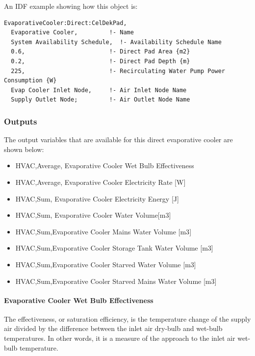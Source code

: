 An IDF example showing how this object is:

\begin{lstlisting}
EvaporativeCooler:Direct:CelDekPad,
  Evaporative Cooler,         !- Name
  System Availability Schedule,  !- Availability Schedule Name
  0.6,                        !- Direct Pad Area {m2}
  0.2,                        !- Direct Pad Depth {m}
  225,                        !- Recirculating Water Pump Power Consumption {W}
  Evap Cooler Inlet Node,     !- Air Inlet Node Name
  Supply Outlet Node;         !- Air Outlet Node Name
\end{lstlisting}

\subsubsection{Outputs}

The output variables that are available for this direct evaporative cooler are shown below:

\begin{itemize}
\item
  HVAC,Average, Evaporative Cooler Wet Bulb Effectiveness
\item
  HVAC,Average, Evaporative Cooler Electricity Rate {[}W{]}
\item
  HVAC,Sum, Evaporative Cooler Electricity Energy {[}J{]}
\item
  HVAC,Sum, Evaporative Cooler Water Volume{[}m3{]}
\item
  HVAC,Sum,Evaporative Cooler Mains Water Volume {[}m3{]}
\item
  HVAC,Sum,Evaporative Cooler Storage Tank Water Volume {[}m3{]}
\item
  HVAC,Sum,Evaporative Cooler Starved Water Volume {[}m3{]}
\item
  HVAC,Sum,Evaporative Cooler Starved Mains Water Volume {[}m3{]}
\end{itemize}

\paragraph{Evaporative Cooler Wet Bulb Effectiveness}\label{evaporative-cooler-wet-bulb-effectiveness}

The effectiveness, or saturation efficiency, is the temperature change of the supply air divided by the difference between the inlet air dry-bulb and wet-bulb temperatures. In other words, it is a measure of the approach to the inlet air wet-bulb temperature.

